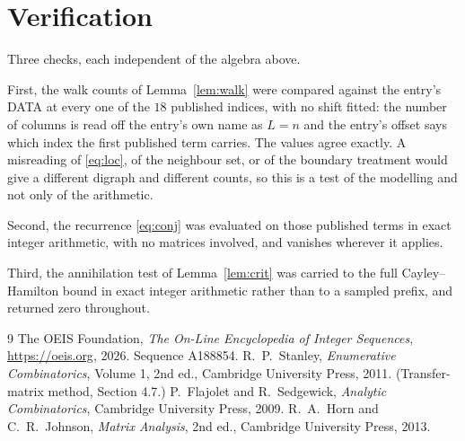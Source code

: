 \documentclass[11pt,a4paper]{article}
\theoremstyle{plain}
\theoremstyle{definition}
\begin{document}
\section{Verification}

Three checks, each independent of the algebra above.

First, the walk counts of Lemma~\ref{lem:walk} were compared against the entry's DATA at
every one of the $18$ published indices, with no shift fitted: the number of columns is
read off the entry's own name as $L=n$ and the entry's offset says which index the first
published term carries. The values agree exactly. A misreading of \eqref{eq:loc}, of the
neighbour set, or of the boundary treatment would give a different digraph and different
counts, so this is a test of the modelling and not only of the arithmetic.

Second, the recurrence \eqref{eq:conj} was evaluated on those published terms in exact
integer arithmetic, with no matrices involved, and vanishes wherever it applies.

Third, the annihilation test of Lemma~\ref{lem:crit} was carried to the full
Cayley--Hamilton bound in exact integer arithmetic rather than to a sampled prefix, and
returned zero throughout.

\begin{thebibliography}{9}
 The OEIS Foundation, \emph{The On-Line Encyclopedia of Integer
Sequences}, \url{https://oeis.org}, 2026. Sequence A188854.
 R.~P.~Stanley, \emph{Enumerative Combinatorics}, Volume 1, 2nd ed.,
Cambridge University Press, 2011. (Transfer-matrix method, Section 4.7.)
 P.~Flajolet and R.~Sedgewick, \emph{Analytic Combinatorics}, Cambridge
University Press, 2009.
 R.~A.~Horn and C.~R.~Johnson, \emph{Matrix Analysis}, 2nd ed., Cambridge
University Press, 2013.
\end{thebibliography}
\end{document}
